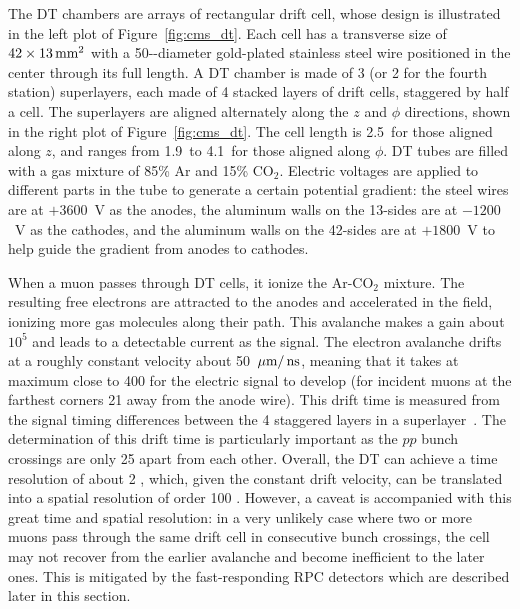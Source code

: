 The DT chambers are arrays of rectangular drift cell, whose design is illustrated in the left plot of Figure~\ref{fig:cms_dt}.
Each cell has a transverse size of $42 \times 13 \,\text{mm}^{2}$ with a 50-\mum-diameter 
gold-plated stainless steel wire positioned in the center through its full length.
A DT chamber is made of 3 (or 2 for the fourth station) superlayers, each made of 4 stacked layers of drift cells, staggered by half a cell.
The superlayers are aligned alternately along the $z$ and $\phi$ directions, shown in the right plot of Figure~\ref{fig:cms_dt}.
The cell length is 2.5~\meter for those aligned along $z$, and ranges from 1.9~\meter to 4.1~\meter for those aligned along $\phi$.
DT tubes are filled with a gas mixture of 85\% Ar and 15\% $\text{CO}_{2}$.
Electric voltages are applied to different parts in the tube to generate a certain potential gradient:
the steel wires are at $+3600$~V as the anodes, the aluminum walls on the 13-\mm sides are at $-1200$~V as the cathodes,
and the aluminum walls on the 42-\mm sides are at $+1800$~V to help guide the gradient from anodes to cathodes.

When a muon passes through DT cells, it ionize the $\text{Ar-CO}_{2}$ mixture. 
The resulting free electrons are attracted to the anodes and accelerated in the field, ionizing more gas molecules along their path.
This avalanche makes a gain about $10^5$ and leads to a detectable current as the signal.
The electron avalanche drifts at a roughly constant velocity about 50 $\,\mu\text{m}/\,\text{ns}$, 
meaning that it takes at maximum close to 400 \ns for the electric signal to develop 
(for incident muons at the farthest corners 21 \mm away from the anode wire).
This drift time is measured from the signal timing differences between the 4 staggered layers in a superlayer~\cite{ARCE2004441}.
The determination of this drift time is particularly important as the $pp$ bunch crossings are only 25 \ns apart from each other.
Overall, the DT can achieve a time resolution of about 2 \ns, which, given the constant drift velocity, 
can be translated into a spatial resolution of order 100 \mum.
However, a caveat is accompanied with this great time and spatial resolution: 
in a very unlikely case where two or more muons pass through the same drift cell in consecutive bunch crossings,
the cell may not recover from the earlier avalanche and become inefficient to the later ones.
This is mitigated by the fast-responding RPC detectors which are described later in this section.

